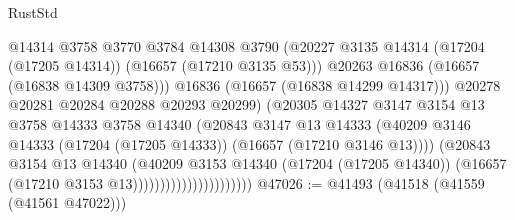 \begin{lexlean}{RustStd}
\begin{coremodule}
                                            @14314
                                            @3758
                                            @3770
                                            @3784
                                            @14308
                                            @3790
                                            (@20227
                                              @3135
                                              @14314
                                              (@17204 (@17205 @14314))
                                              (@16657 (@17210 @3135 @53)))
                                            @20263
                                            @16836
                                            (@16657 (@16838 @14309 @3758)))
                                          @16836
                                          (@16657 (@16838 @14299 @14317)))
                                        @20278
                                        @20281
                                        @20284
                                        @20288
                                        @20293
                                        @20299)
                                      (@20305
                                        @14327
                                        @3147
                                        @3154
                                        @13
                                        @3758
                                        @14333
                                        @3758
                                        @14340
                                        (@20843
                                          @3147
                                          @13
                                          @14333
                                          (@40209
                                            @3146
                                            @14333
                                            (@17204 (@17205 @14333))
                                            (@16657 (@17210 @3146 @13))))
                                        (@20843
                                          @3154
                                          @13
                                          @14340
                                          (@40209
                                            @3153
                                            @14340
                                            (@17204 (@17205 @14340))
                                            (@16657 (@17210 @3153 @13))))))))))))))))))))))
@47026 := @41493 (@41518 (@41559 (@41561 @47022)))

\end{coremodule}
\end{lexlean}

